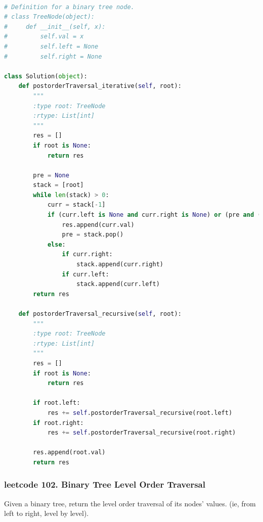 \documentclass[a4paper,10pt]{article}
\begin{document}
\begin{lstlisting}[language=Python, caption=Problem145. Binary Tree Postorder Traversal]

# Definition for a binary tree node.
# class TreeNode(object):
#     def __init__(self, x):
#         self.val = x
#         self.left = None
#         self.right = None

class Solution(object):
    def postorderTraversal_iterative(self, root):
        """
        :type root: TreeNode
        :rtype: List[int]
        """
        res = []
        if root is None:
            return res

        pre = None
        stack = [root]
        while len(stack) > 0:
            curr = stack[-1]
            if (curr.left is None and curr.right is None) or (pre and (pre == curr.left or pre == curr.right)):
                res.append(curr.val)
                pre = stack.pop()
            else:
                if curr.right:
                    stack.append(curr.right)
                if curr.left:
                    stack.append(curr.left)
        return res

    def postorderTraversal_recursive(self, root):
        """
        :type root: TreeNode
        :rtype: List[int]
        """
        res = []
        if root is None:
            return res

        if root.left:
            res += self.postorderTraversal_recursive(root.left)
        if root.right:
            res += self.postorderTraversal_recursive(root.right)
            
        res.append(root.val)
        return res
\end{lstlisting}



\subsubsection{leetcode 102. Binary Tree Level Order Traversal}
Given a binary tree, return the level order traversal of its nodes' values. (ie, from left to right, level by level). \\
\end{document}
